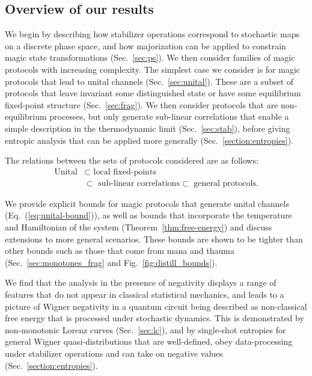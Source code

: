 \documentclass[pra,
aps,
twocolumn,
superscriptaddress,
groupedaddress,
nofootinbib,
reprint
]{revtex4-1}
\begin{document}
\subsection{Overview of our results}
We begin by describing how stabilizer operations correspond to stochastic maps on a discrete phase space, and how majorization can be applied to constrain magic state transformations (Sec.~\ref{sec:ps}). We then consider families of magic protocols with increasing complexity. The simplest case we consider is for magic protocols that lead to unital channels (Sec.~\ref{sec:unital}). These are a subset of protocols that leave invariant some distinguished state or have some equilibrium fixed-point structure (Sec.~\ref{sec:frag}). We then consider protocols that are non-equilibrium processes, but only generate sub-linear correlations that enable a simple description in the thermodynamic limit (Sec.~\ref{sec:stab}), before giving entropic analysis that can be applied more generally (Sec.~\ref{section:entropies}).

The relations between the sets of protocols considered are as follows:
\begin{align}
\mbox{Unital} &\subset \mbox{ local fixed-points} \nonumber\\ 
&\subset \mbox{ sub-linear correlations} \subset \mbox{ general protocols.} \nonumber
\end{align}

We provide explicit bounds for magic protocols that generate unital channels (Eq.~(\ref{eq:unital-bound})), as well as bounds that incorporate the temperature and Hamiltonian of the system (Theorem~\ref{thm:free-energy}) and discuss extensions to more general scenarios. These bounds are shown to be tighter than other bounds such as those that come from mana and thauma (Sec.~\ref{sec:monotones_frag} and Fig.~\ref{fig:distill_bounds}). 

We find that the analysis in the presence of negativity displays a range of features that do not appear in classical statistical mechanics, and leads to a picture of Wigner negativity in a quantum circuit being described as non-classical free energy that is processed under stochastic dynamics. This is demonstrated by non-monotonic Lorenz curves (Sec.~\ref{sec:lc}), and by single-shot entropies for general Wigner quasi-distributions that are well-defined, obey data-processing under stabilizer operations and can take on negative values (Sec.~\ref{section:entropies}).
\end{document}
